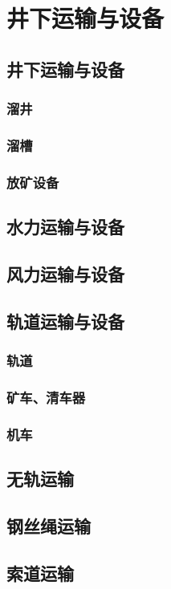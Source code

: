 \documentclass[UTF8]{../../ApplicationUniverse}
\begin{document}
\section{井下运输与设备}
    \subsection{井下运输与设备}
        \subsubsection{溜井}
        \subsubsection{溜槽}
        \subsubsection{放矿设备}
    \subsection{水力运输与设备}
    \subsection{风力运输与设备}
    \subsection{轨道运输与设备}
        \subsubsection{轨道}
        \subsubsection{矿车、清车器}
        \subsubsection{机车}
    \subsection{无轨运输}
    \subsection{钢丝绳运输}
    \subsection{索道运输}
\end{document}
